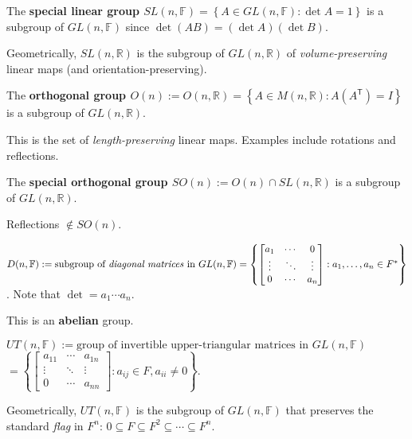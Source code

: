 \documentclass{notes}
\begin{document}
\begin{eg}
  The {\boldmath \bfseries special linear group $SL(n, \mathbb F) = \left \{ A \in GL(n, \mathbb F) : \det A = 1 \right \}$} is a subgroup of $GL(n, \mathbb F)$ since $\det(A B) = (\det A) (\det B)$.

  Geometrically, $SL(n, \mathbb R)$ is the subgroup of $GL(n, \mathbb R)$ of \textit{volume-preserving} linear maps (and orientation-preserving).
\end{eg}

\begin{eg}
  The {\boldmath \bfseries orthogonal group $O(n) := O(n, \mathbb R) = \left \{ A \in M(n, \mathbb R) : A (A^\mathsf T) = I \right \}$} is a subgroup of $GL(n, \mathbb R)$.

  This is the set of \textit{length-preserving} linear maps.
  Examples include rotations and reflections.
\end{eg}

\begin{eg}
  The {\boldmath \bfseries special orthogonal group $SO(n) := O(n) \cap SL(n, \mathbb R)$} is a subgroup of $GL(n, \mathbb R)$.

  Reflections $\not \in SO(n)$.
\end{eg}

\begin{eg}
  $D(n, \mathbb F) := \text{subgroup of \textit{diagonal matrices} in $GL(n, \mathbb F)$} = \left \{ \begin{bmatrix} a_1 & \cdots & 0 \\ \vdots & \ddots & \vdots \\ 0 & \cdots & a_n \end{bmatrix} : a_1, \dots, a_n \in F^* \right \}$. Note that $\det = a_1 \cdots a_n$.
\end{eg}

\begin{rmk}
  This is an {\boldmath \bfseries abelian} group.
\end{rmk}

\begin{eg}
  $UT(n, \mathbb F) := \text{group of invertible upper-triangular matrices in $GL(n, \mathbb F)$}$ \\ $= \left \{ \begin{bmatrix} a_{11} & \cdots & a_{1n} \\ \vdots & \ddots & \vdots \\ 0 & \cdots & a_{nn} \end{bmatrix} : a_{ij} \in F, a_{ii} \neq 0 \right \}$.

  Geometrically, $UT(n, \mathbb F)$ is the subgroup of $GL(n, \mathbb F)$ that preserves the standard \textit{flag} in $F^n$: $0 \subseteq F \subseteq F^2 \subseteq \cdots \subseteq F^n$.
\end{eg}
\end{document}
